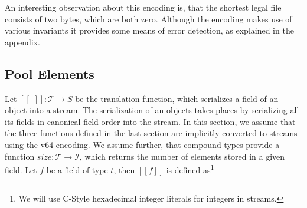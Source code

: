 \documentclass[a4paper,10pt]{article}
\newcommand{\den}[1]{[\![#1]\!]}
\begin{document}
An interesting observation about this encoding is, that the shortest legal file consists of two bytes, which are both zero. Although the encoding makes use of various invariants it provides some means of error detection, as explained in the appendix.

\subsection{Pool Elements}

Let $\den{\_}:\mathcal{T} → S$ be the translation function, which serializes a field of an object into a stream. The serialization of an objects takes places by serializing all its fields in canonical field order into the stream. In this section, we assume that the three functions defined in the last section are implicitly converted to streams using the v64 encoding. We assume further, that compound types provide a function $size: \mathcal{T} → \mathcal{I}$, which returns the number of elements stored in a given field.
Let $f$ be a field of type $t$, then $\den{f}$ is defined as\footnote{We will use C-Style hexadecimal integer literals for integers in streams.}
\end{document}
